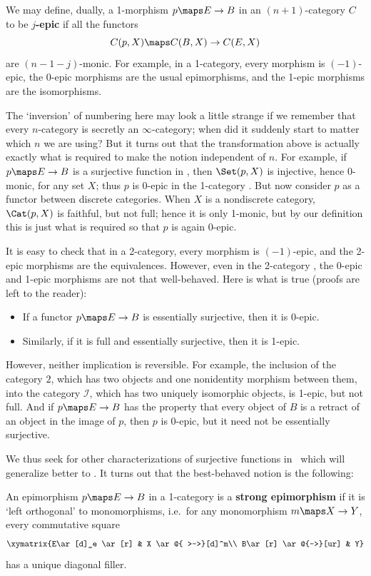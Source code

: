\documentclass[12pt]{amsart}
\begin{document}
We may define, dually, a 1-morphism $p\maps E\to B$ in an
$(n+1)$-category $C$ to be \textbf{$j$-epic} if all the functors
\[C(p,X)\maps C(B,X) \to C(E,X)
\]
are $(n-1-j)$-monic.  For example, in a 1-category, every morphism is
$(-1)$-epic, the 0-epic morphisms are the usual epimorphisms, and the
1-epic morphisms are the isomorphisms.

The `inversion' of numbering here may look a little strange if we
remember that every $n$-category is secretly an $\infty$-category;
when did it suddenly start to matter which $n$ we are using?  But it
turns out that the transformation above is actually exactly what is
required to make the notion independent of $n$.  For example, if
$p\maps E\to B$ is a surjective function in \Set, then $\Set(p,X)$ is
injective, hence 0-monic, for any set $X$; thus $p$ is 0-epic in the
1-category \Set.  But now consider $p$ as a functor between discrete
categories.  When $X$ is a nondiscrete category, $\Cat(p,X)$ is
faithful, but not full; hence it is only 1-monic, but by our
definition this is just what is required so that $p$ is again 0-epic.

It is easy to check that in a 2-category, every morphism is
$(-1)$-epic, and the 2-epic morphisms are the equivalences.  However,
even in the 2-category \Cat, the 0-epic and 1-epic morphisms are not
that well-behaved.  Here is what is true (proofs are left to the
reader):
\begin{itemize}
\item If a functor $p\maps E\to B$ is essentially surjective, then it
  is 0-epic.
\item Similarly, if it is full and essentially surjective, then it is
  1-epic.
\end{itemize}

However, neither implication is reversible.  For example, the
inclusion of the category $2$, which has two objects and one
nonidentity morphism between them, into the category $\mathscr{I}$,
which has two uniquely isomorphic objects, is 1-epic, but not full.
And if $p\maps E\to B$ has the property that every object of $B$ is a
retract of an object in the image of $p$, then $p$ is 0-epic, but it
need not be essentially surjective.

We thus seek for other characterizations of surjective functions in
\Set\ which will generalize better to \Cat.  It turns out that the
best-behaved notion is the following:

\begin{defn}
  An epimorphism $p\maps E\to B$ in a 1-category is a \textbf{strong
    epimorphism} if it is `left orthogonal' to monomorphisms, i.e.\
  for any monomorphism $m\maps X\to Y$, every commutative square
  \[\xymatrix{E\ar[d]_e \ar[r] & X \ar@{ >->}[d]^m\\ B\ar[r] \ar@{-->}[ur] & Y}\]
  has a unique diagonal filler.  
\end{defn}
\end{document}
